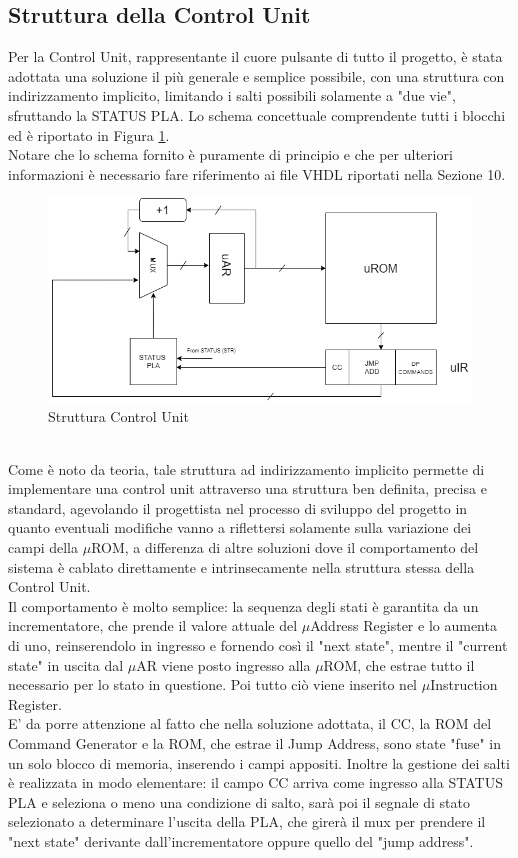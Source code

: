 \documentclass[a4paper, titlepage]{article}
\begin{document}
\subsection{Struttura della Control Unit}
Per la Control Unit, rappresentante il cuore pulsante di tutto il progetto, è stata adottata una soluzione il più generale e semplice possibile, con una struttura con indirizzamento implicito, limitando i salti possibili solamente a "due vie", sfruttando la STATUS PLA. Lo schema concettuale comprendente tutti i blocchi ed è riportato in Figura \ref{fig:cu}.\\Notare che lo schema fornito è puramente di principio e che per ulteriori informazioni è necessario fare riferimento ai file VHDL riportati nella Sezione 10.
\begin{figure}[h]
    \centering
    \includegraphics[scale=0.5]{controlunit.png}
    \caption{Struttura Control Unit}
    \label{fig:cu}
\end{figure}
\\Come è noto da teoria, tale struttura ad indirizzamento implicito permette di implementare una control unit attraverso una struttura ben definita, precisa e standard, agevolando il progettista nel processo di sviluppo del progetto in quanto eventuali modifiche vanno a riflettersi solamente sulla variazione dei campi della $\mu$ROM, a differenza di altre soluzioni dove il comportamento del sistema è cablato direttamente e intrinsecamente nella struttura stessa della Control Unit.\\
Il comportamento è molto semplice: la sequenza degli stati è garantita da un incrementatore, che prende il valore attuale del $\mu$Address Register e lo aumenta di uno, reinserendolo in ingresso e fornendo così il "next state", mentre il "current state" in uscita dal $\mu$AR viene posto ingresso alla $\mu$ROM, che estrae tutto il necessario per lo stato in questione. Poi tutto ciò viene inserito nel $\mu$Instruction Register.\\E' da porre attenzione al fatto che nella soluzione adottata, il CC, la ROM del Command Generator e la ROM, che estrae il Jump Address, sono state "fuse" in un solo blocco di memoria, inserendo i campi appositi. Inoltre la gestione dei salti è realizzata in modo elementare: il campo CC arriva come ingresso alla STATUS PLA e seleziona o meno una condizione di salto, sarà poi il segnale di stato selezionato a determinare l'uscita della PLA, che girerà il mux per prendere il "next state" derivante dall'incrementatore oppure quello del "jump address".\\
\end{document}
